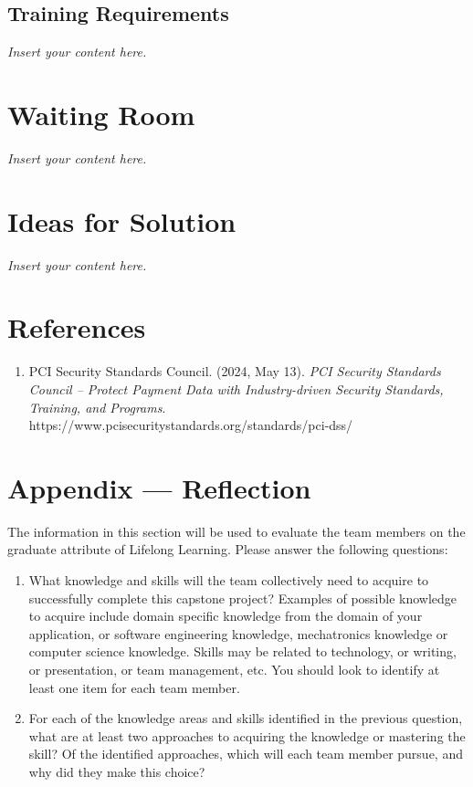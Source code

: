 \documentclass[12pt]{article}
\newcommand{\lips}{\textit{Insert your content here.}}
\begin{document}
\subsection{Training Requirements}
\lips

\section{Waiting Room}
\lips

\section{Ideas for Solution}
\lips

\newpage{}
\section*{References}
\begin{enumerate}
    \item PCI Security Standards Council. (2024, May 13). \textit{PCI Security Standards Council – Protect Payment Data with Industry-driven Security Standards, Training, and Programs}. https://www.pcisecuritystandards.org/standards/pci-dss/
\end{enumerate}

\newpage{}
\section*{Appendix --- Reflection}

The information in this section will be used to evaluate the team members on the
graduate attribute of Lifelong Learning.  Please answer the following questions:

\begin{enumerate}
  \item What knowledge and skills will the team collectively need to acquire to
  successfully complete this capstone project?  Examples of possible knowledge
  to acquire include domain specific knowledge from the domain of your
  application, or software engineering knowledge, mechatronics knowledge or
  computer science knowledge.  Skills may be related to technology, or writing,
  or presentation, or team management, etc.  You should look to identify at
  least one item for each team member.
  \item For each of the knowledge areas and skills identified in the previous
  question, what are at least two approaches to acquiring the knowledge or
  mastering the skill?  Of the identified approaches, which will each team
  member pursue, and why did they make this choice?
\end{enumerate}
\end{document}
